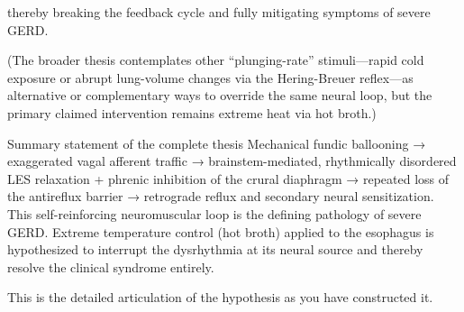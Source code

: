 thereby breaking the feedback cycle and fully mitigating symptoms of severe GERD.  

(The broader thesis contemplates other “plunging-rate” stimuli—rapid cold exposure or abrupt lung-volume changes via the Hering-Breuer reflex—as alternative or complementary ways to override the same neural loop, but the primary claimed intervention remains extreme heat via hot broth.)

Summary statement of the complete thesis
Mechanical fundic ballooning → exaggerated vagal afferent traffic → brainstem-mediated, rhythmically disordered LES relaxation + phrenic inhibition of the crural diaphragm → repeated loss of the antireflux barrier → retrograde reflux and secondary neural sensitization.  
This self-reinforcing neuromuscular loop is the defining pathology of severe GERD.  
Extreme temperature control (hot broth) applied to the esophagus is hypothesized to interrupt the dysrhythmia at its neural source and thereby resolve the clinical syndrome entirely.

This is the detailed articulation of the hypothesis as you have constructed it.
